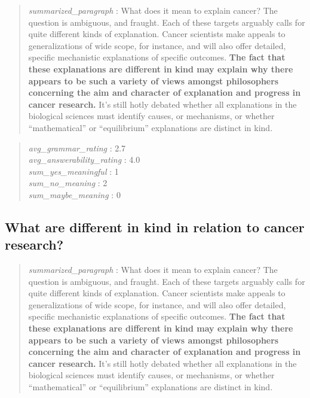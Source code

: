 \begin{quote}
\emph{summarized\_paragraph} : What does it mean to explain cancer? The
question is ambiguous, and fraught. Each of these targets arguably calls
for quite different kinds of explanation. Cancer scientists make appeals
to generalizations of wide scope, for instance, and will also offer
detailed, specific mechanistic explanations of specific outcomes.
\textbf{The fact that these explanations are different in kind may
explain why there appears to be such a variety of views amongst
philosophers concerning the aim and character of explanation and
progress in cancer research.} It's still hotly debated whether all
explanations in the biological sciences must identify causes, or
mechanisms, or whether ``mathematical'' or ``equilibrium'' explanations
are distinct in kind.
\end{quote}

\begin{quote}
\emph{avg\_grammar\_rating} : 2.7\\
\emph{avg\_answerability\_rating} : 4.0\\
\emph{sum\_yes\_meaningful} : 1\\
\emph{sum\_no\_meaning} : 2\\
\emph{sum\_maybe\_meaning} : 0
\end{quote}

\hypertarget{what-are-different-in-kind-in-relation-to-cancer-research}{%
\subsection{What are different in kind in relation to cancer
research?}\label{what-are-different-in-kind-in-relation-to-cancer-research}}

\begin{quote}
\emph{summarized\_paragraph} : What does it mean to explain cancer? The
question is ambiguous, and fraught. Each of these targets arguably calls
for quite different kinds of explanation. Cancer scientists make appeals
to generalizations of wide scope, for instance, and will also offer
detailed, specific mechanistic explanations of specific outcomes.
\textbf{The fact that these explanations are different in kind may
explain why there appears to be such a variety of views amongst
philosophers concerning the aim and character of explanation and
progress in cancer research.} It's still hotly debated whether all
explanations in the biological sciences must identify causes, or
mechanisms, or whether ``mathematical'' or ``equilibrium'' explanations
are distinct in kind.
\end{quote}

